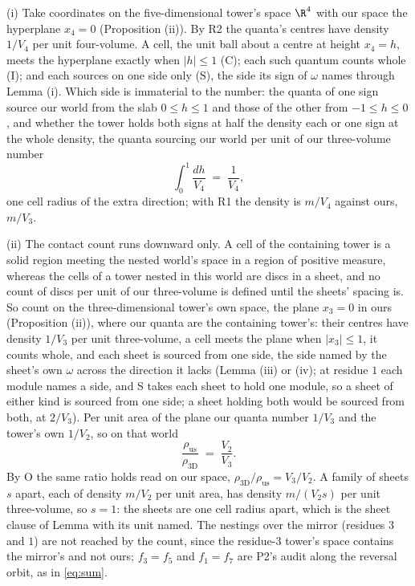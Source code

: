 (i) Take coordinates on the five-dimensional tower's space $\R^{4}$ with our space the hyperplane $x_{4} = 0$ (Proposition (ii)). By R2 the quanta's centres have density $1/V_{4}$ per unit four-volume. A cell, the unit ball about a centre at height $x_{4} = h$, meets the hyperplane exactly when $|h| \leq 1$ (C); each such quantum counts whole (I); and each sources on one side only (S), the side its sign of $\omega$ names through Lemma (i). Which side is immaterial to the number: the quanta of one sign source our world from the slab $0 \leq h \leq 1$ and those of the other from $-1 \leq h \leq 0$, and whether the tower holds both signs at half the density each or one sign at the whole density, the quanta sourcing our world per unit of our three-volume number
\[
\int_{0}^{1}\frac{dh}{V_{4}} \;=\; \frac{1}{V_{4}},
\]
one cell radius of the extra direction; with R1 the density is $m/V_{4}$ against ours, $m/V_{3}$.

(ii) The contact count runs downward only. A cell of the containing tower is a solid region meeting the nested world's space in a region of positive measure, whereas the cells of a tower nested in this world are discs in a sheet, and no count of discs per unit of our three-volume is defined until the sheets' spacing is. So count on the three-dimensional tower's own space, the plane $x_{3} = 0$ in ours (Proposition (ii)), where our quanta are the containing tower's: their centres have density $1/V_{3}$ per unit three-volume, a cell meets the plane when $|x_{3}| \leq 1$, it counts whole, and each sheet is sourced from one side, the side named by the sheet's own $\omega$ across the direction it lacks (Lemma (iii) or (iv); at residue $1$ each module names a side, and S takes each sheet to hold one module, so a sheet of either kind is sourced from one side; a sheet holding both would be sourced from both, at $2/V_{3}$). Per unit area of the plane our quanta number $1/V_{3}$ and the tower's own $1/V_{2}$, so on that world
\[
\frac{\rho_{\mathrm{us}}}{\rho_{3\mathrm{D}}} \;=\; \frac{V_{2}}{V_{3}} .
\]
By O the same ratio holds read on our space, $\rho_{3\mathrm{D}}/\rho_{\mathrm{us}} = V_{3}/V_{2}$. A family of sheets $s$ apart, each of density $m/V_{2}$ per unit area, has density $m/(V_{2}s)$ per unit three-volume, so $s = 1$: the sheets are one cell radius apart, which is the sheet clause of Lemma  with its unit named. The nestings over the mirror (residues $3$ and $1$) are not reached by the count, since the residue-$3$ tower's space contains the mirror's and not ours; $f_{3} = f_{5}$ and $f_{1} = f_{7}$ are P2's audit along the reversal orbit, as in \eqref{eq:sum}.

